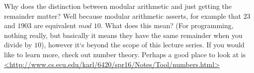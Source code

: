 \documentclass[11]{article}
\begin{document}
Why does the distinction between modular arithmetic and just getting the remainder matter? Well because modular arithmetic asserts, for example that $23$ and $1903$ are equivalent $mod$ $10$. What does this mean? (For programming, nothing really, but basically it means they have the same remainder when you divide by $10$), however it`s beyond the scope of this lecture series. If you would like to learn more, check out number theory. Perhaps a good place to look at is \url{<http://www.cs.ecu.edu/karl/6420/spr16/Notes/Tool/numbers.html>}
\end{document}
